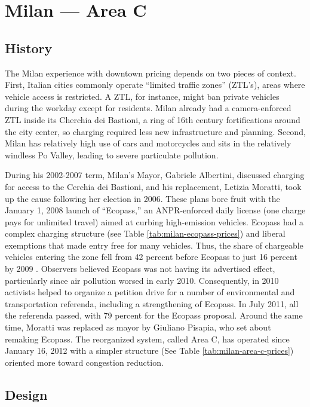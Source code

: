 
\section{Milan --- Area C}

\subsection{History}

The Milan experience with downtown pricing depends on two pieces of context. First, Italian cities commonly operate ``limited traffic zones'' (ZTL's), areas where vehicle access is restricted. A ZTL, for instance, might ban private vehicles during the workday except for residents. Milan already had a camera-enforced ZTL inside its Cherchia dei Bastioni, a ring of 16th century fortifications around the city center, so charging required less new infrastructure and planning. Second, Milan has relatively high use of cars and motorcycles and sits in the relatively windless Po Valley, leading to severe particulate pollution.

During his 2002-2007 term, Milan's Mayor, Gabriele Albertini, discussed charging for access to the Cerchia dei Bastioni, and his replacement, Letizia Moratti, took up the cause following her election in 2006. These plans bore fruit with the January 1, 2008 launch of ``Ecopass,'' an ANPR-enforced daily license (one charge pays for unlimited travel) aimed at curbing high-emission vehicles. Ecopass had a complex charging structure (see Table \ref{tab:milan-ecopass-prices}) and liberal exemptions that made entry free for many vehicles. Thus, the share of chargeable vehicles entering the zone fell from 42 percent before Ecopass to just 16 percent by 2009 \citep[p. 5, Table 3]{Danielis2011}. Observers believed Ecopass was not having its advertised effect, particularly since air pollution worsed in early 2010. Consequently, in 2010 activists helped to organize a petition drive for a number of environmental and transportation referenda, including a strengthening of Ecopass. In July 2011, all the referenda passed, with 79 percent for the Ecopass proposal. Around the same time, Moratti was replaced as mayor by Giuliano Pisapia, who set about remaking Ecopass. The reorganized system, called Area C, has operated since January 16, 2012 with a simpler structure (See Table \ref{tab:milan-area-c-prices}) oriented more toward congestion reduction. 

\subsection{Design}

